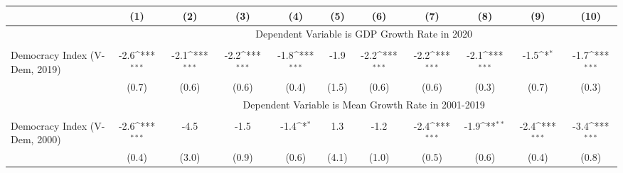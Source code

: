 {
\def\sym#1{\ifmmode^{#1}\else\(^{#1}\)\fi}
\begin{tabular}{l*{10}{c}}
\hline\hline
&\multicolumn{1}{c}{(1)}         &\multicolumn{1}{c}{(2)}         &\multicolumn{1}{c}{(3)}         &\multicolumn{1}{c}{(4)}         &\multicolumn{1}{c}{(5)}         &\multicolumn{1}{c}{(6)}         &\multicolumn{1}{c}{(7)}         &\multicolumn{1}{c}{(8)}         &\multicolumn{1}{c}{(9)}         &\multicolumn{1}{c}{(10)}         \\
\hline & \multicolumn{10}{c}{Dependent Variable is GDP Growth Rate in 2020} \\\cline{2-11}\\[-1.8ex]
Democracy Index (V-Dem, 2019)&        -2.6\sym{***}&        -2.1\sym{***}&        -2.2\sym{***}&        -1.8\sym{***}&        -1.9         &        -2.2\sym{***}&        -2.2\sym{***}&        -2.1\sym{***}&        -1.5\sym{*}  &        -1.7\sym{***}\\
&       (0.7)         &       (0.6)         &       (0.6)         &       (0.4)         &       (1.5)         &       (0.6)         &       (0.6)         &       (0.3)         &       (0.7)         &       (0.3)         \\

& \multicolumn{10}{c}{Dependent Variable is Mean Growth Rate in 2001-2019} \\\cline{2-11}\\[-1.8ex]
Democracy Index (V-Dem, 2000)&        -2.6\sym{***}&        -4.5         &        -1.5         &        -1.4\sym{*}  &         1.3         &        -1.2         &        -2.4\sym{***}&        -1.9\sym{**} &        -2.4\sym{***}&        -3.4\sym{***}\\
&       (0.4)         &       (3.0)         &       (0.9)         &       (0.6)         &       (4.1)         &       (1.0)         &       (0.5)         &       (0.6)         &       (0.4)         &       (0.8)         \\


\end{tabular}}
